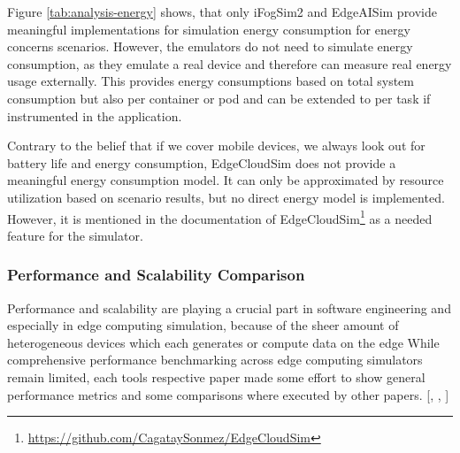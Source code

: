 Figure \ref{tab:analysis-energy} shows, that only iFogSim2 and EdgeAISim provide meaningful implementations for simulation energy consumption for energy concerns scenarios.
However, the emulators do not need to simulate energy consumption, as they emulate a real device and therefore can measure real energy usage externally.
This provides energy consumptions based on total system consumption but also per container or pod and can be extended to per task if instrumented in the application.

Contrary to the belief that if we cover mobile devices, we always look out for battery life and energy consumption, EdgeCloudSim does not provide a meaningful energy consumption model.
It can only be approximated by resource utilization based on scenario results, but no direct energy model is implemented.
However, it is mentioned in the documentation of EdgeCloudSim\footnote{\url{https://github.com/CagataySonmez/EdgeCloudSim}} as a needed feature for the simulator.

\subsubsection{Performance and Scalability Comparison}
Performance and scalability are playing a crucial part in software engineering and especially in edge computing simulation, because of the sheer amount of heterogeneous devices which each generates or compute data on the edge
While comprehensive performance benchmarking across edge computing simulators remain limited, each tools respective paper made some effort to show general performance metrics and some comparisons where executed by other papers. [\cite{s23073492}, \cite{MECHALIKH2025103042}, \cite{fi11030055}]

